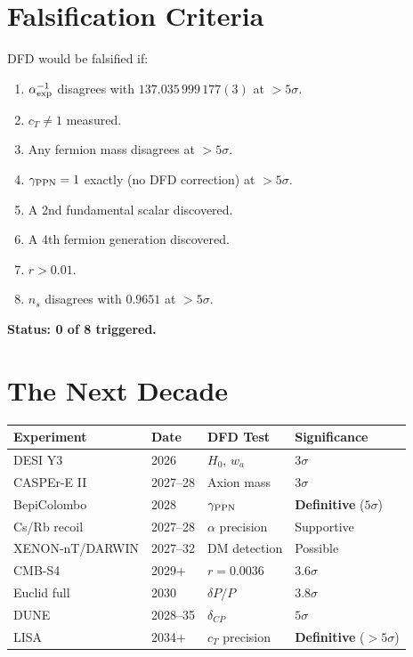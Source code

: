 \documentclass[11pt,a4paper]{article}
\begin{document}
\section{Falsification Criteria}

DFD would be falsified if:
\begin{enumerate}[nosep]
\item $\alpha^{-1}_{\rm exp}$ disagrees with $137.035\,999\,177(3)$ at $> 5\sigma$.
\item $c_T \neq 1$ measured.
\item Any fermion mass disagrees at $> 5\sigma$.
\item $\gamma_{\rm PPN} = 1$ exactly (no DFD correction) at $> 5\sigma$.
\item A 2nd fundamental scalar discovered.
\item A 4th fermion generation discovered.
\item $r > 0.01$.
\item $n_s$ disagrees with $0.9651$ at $> 5\sigma$.
\end{enumerate}

\textbf{Status: 0 of 8 triggered.}

\section{The Next Decade}

\begin{center}
\begin{tabular}{llll}
\toprule
\textbf{Experiment} & \textbf{Date} & \textbf{DFD Test} & \textbf{Significance} \\
\midrule
DESI Y3 & 2026 & $H_0$, $w_a$ & $3\sigma$ \\
CASPEr-E II & 2027--28 & Axion mass & $3\sigma$ \\
BepiColombo & 2028 & $\gamma_{\rm PPN}$ & \textbf{Definitive} ($5\sigma$) \\
Cs/Rb recoil & 2027--28 & $\alpha$ precision & Supportive \\
XENON-nT/DARWIN & 2027--32 & DM detection & Possible \\
CMB-S4 & 2029+ & $r = 0.0036$ & $3.6\sigma$ \\
Euclid full & 2030 & $\delta P/P$ & $3.8\sigma$ \\
DUNE & 2028--35 & $\delta_{CP}$ & $5\sigma$ \\
LISA & 2034+ & $c_T$ precision & \textbf{Definitive} ($> 5\sigma$) \\
\bottomrule
\end{tabular}
\end{center}
\end{document}
